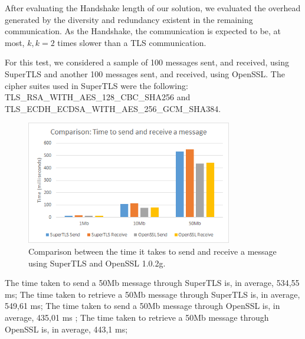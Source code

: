 \documentclass{sig-alternate-05-2015}
\begin{document}
After evaluating the Handshake length of our solution, we evaluated the overhead generated by the diversity and redundancy existent in the remaining communication. As the Handshake, the communication is expected to be, at most, $k, k = 2$ times slower than a TLS communication.

For this test, we considered a sample of 100 messages sent, and received, using SuperTLS and another 100 messages sent, and received, using OpenSSL. The cipher suites used in SuperTLS were the following:\\TLS\_RSA\_WITH\_AES\_128\_CBC\_SHA256 and\\
TLS\_ECDH\_ECDSA\_WITH\_AES\_256\_GCM\_SHA384.

\begin{figure}[t]
\includegraphics[width=9cm]{eval_time_2}
\centering
\caption{Comparison between the time it takes to send and receive a message using SuperTLS and OpenSSL 1.0.2g.}
\label{fig:eval_time_2}
\end{figure}

The time taken to send a 50Mb message through SuperTLS is, in average, 534,55 ms;
The time taken to retrieve a 50Mb message through SuperTLS is, in average, 549,61 ms;
The time taken to send a 50Mb message through OpenSSL is, in average, 435,01 ms ;
The time taken to retrieve a 50Mb message through OpenSSL is, in average, 443,1 ms;
\end{document}
